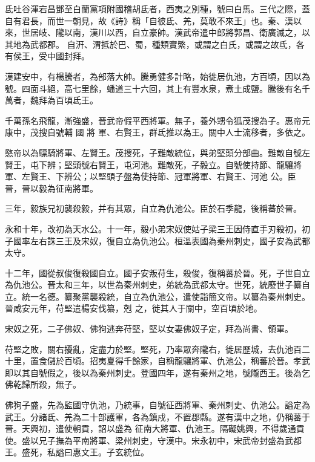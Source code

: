 
\begin{pinyinscope}

 氐吐谷渾宕昌鄧至白蘭黨項附國稽胡氐者，西夷之別種，號曰白馬。三代之際，蓋自有君長，而世一朝見，故《詩》稱「自彼氐、羌，莫敢不來王」也。秦、漢以來，世居岐、隴以南，漢川以西，自立豪帥。漢武帝遣中郎將郭昌、衛廣滅之，以其地為武都郡。
 自汧、渭抵於巴、蜀，種類實繁，或謂之白氏，或謂之故氐，各有侯王，受中國封拜。



 漢建安中，有楊騰者，為部落大帥。騰勇健多計略，始徙居仇池，方百頃，因以為號。四面斗絕，高七里餘，蟠道三十六回，其上有豐水泉，煮土成鹽。騰後有名千萬者，魏拜為百頃氐王。



 千萬孫名飛龍，漸強盛，晉武帝假平西將軍。無子，養外甥令狐茂搜為子。惠帝元康中，茂搜自號輔
 國
 將
 軍、右賢王，群氐推以為王。關中人士流移者，多依之。



 愍帝以為驃騎將軍、左賢王。茂搜死，子難敵統位，與弟堅頭分部曲。難敵自號左賢王，屯下辨；堅頭號右賢王，屯河池。難敵死，子毅立。自號使持節、龍驤將軍、左賢王、下辨公；以堅頭子盤為使持節、冠軍將軍、右賢王、河池
 公。臣晉，晉以毅為征南將軍。



 三年，毅族兄初襲殺毅，并有其眾，自立為仇池公。臣於石季龍，後稱蕃於晉。



 永和十年，改初為天水公。十一年，毅小弟宋奴使姑子梁三王因侍直手刃殺初，初子國率左右誅三王及宋奴，復自立為仇池公。桓溫表國為秦州刺史，國子安為武都太守。



 十二年，國從叔俊復殺國自立。國子安叛苻生，殺俊，復稱蕃於晉。死，子世自立為仇池公。晉太和三年，以世為秦州刺史，弟統為武都太守。世死，統廢世子纂自立。統一名德。纂聚黨襲殺統，自立為仇池公，遣使詣簡文帝。以纂為秦州刺史。晉咸安元年，苻堅遣楊安伐纂，剋
 之，徙其人于關中，空百頃於地。



 宋奴之死，二子佛奴、佛狗逃奔苻堅，堅以女妻佛奴子定，拜為尚書、領軍。



 苻堅之敗，關右擾亂，定盡力於堅。堅死，乃率眾奔隴右，徙居歷城，去仇池百二十里，置食儲於百頃。招夷夏得千餘家，自稱龍驤將軍、仇池公，稱蕃於晉。孝武即以其自號假之，後以為秦州刺史。登國四年，遂有秦州之地，號隴西王。後為乞佛乾歸所殺，無子。



 佛狗子盛，先為監國守仇池，乃統事，自號征西將軍、秦州刺史、仇池公。謚定為武王。分諸氐、羌為二十部護軍，各為鎮戍，不置郡縣。遂有漢中之地，仍稱蕃于晉。天興初，遣使朝貢，詔以盛為
 征南大將軍、仇池王。隔礙姚興，不得歲通貢使。盛以兄子撫為平南將軍、梁州刺史，守漢中。宋永初中，宋武帝封盛為武都王。盛死，私謚曰惠文王。子玄統位。




\end{pinyinscope}
